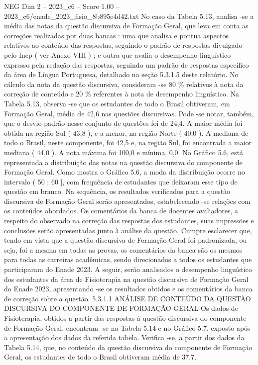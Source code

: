 \begin{textsample}{NEG Dim 2 – 2023\_c6 – Score 1.00 – 2023\_c6/enade\_2023\_fisio\_8b895e4d42.txt}
No caso da Tabela 5.13, analisa -se a média das notas da questão discursiva de Formação Geral, que leva em conta as correções realizadas por duas bancas : uma que analisa e pontua aspectos relativos ao conteúdo das respostas, seguindo o padrão de respostas divulgado pelo Inep ( ver Anexo VIII ) ; e outra que avalia o desempenho linguístico expresso pela redação das respostas, seguindo um padrão de respostas específico da área de Língua Portuguesa, detalhado na seção 5.3.1.5 deste relatório.
No cálculo da nota da questão discursiva, consideram -se 80 \% relativos à nota da correção de conteúdo e 20 \% referentes à nota de desempenho linguístico.
Na Tabela 5.13, observa -se que os estudantes de todo o Brasil obtiveram, em Formação Geral, média de 42,6 nas questões discursivas.
Pode -se notar, também, que o desvio-padrão nesse conjunto de questões foi de 24,4.
A maior média foi obtida na região Sul ( 43,8 ), e a menor, na região Norte ( 40,0 ).
A mediana de todo o Brasil, neste componente, foi 42,5 e, na região Sul, foi encontrada a maior mediana ( 44,0 ).
A nota máxima foi 100,0 e mínima, 0,0.
No Gráfico 5.6, está representada a distribuição das notas na questão discursiva do componente de Formação Geral.
Como mostra o Gráfico 5.6, a moda da distribuição ocorre no intervalo ( 50 ; 60 ], com frequência de estudantes que deixaram esse tipo de questão em branco.
Na sequência, os resultados verificados para a questão discursiva de Formação Geral serão apresentados, estabelecendo -se relações com os conteúdos abordados.
Os comentários da banca de docentes avaliadores, a respeito do observado na correção das respostas dos estudantes, suas impressões e conclusões serão apresentadas junto à análise da questão.
Cumpre esclarecer que, tendo em vista que a questão discursiva de Formação Geral foi padronizada, ou seja, foi a mesma em todas as provas, os comentários da banca são os mesmos para todas as carreiras acadêmicas, sendo direcionados a todos os estudantes que participaram do Enade 2023.
A seguir, serão analisados o desempenho linguístico dos estudantes da área de Fisioterapia na questão discursiva de Formação Geral do Enade 2023, apresentando -se os resultados obtidos e os comentários da banca de correção sobre a questão. 5.3.1.1 ANÁLISE DE CONTEÚDO DA QUESTÃO DISCURSIVA DO COMPONENTE DE FORMAÇÃO GERAL Os dados de Fisioterapia, obtidos a partir das respostas à questão discursiva do componente de Formação Geral, encontram -se na Tabela 5.14 e no Gráfico 5.7, exposto após a apresentação dos dados da referida tabela.
Verifica -se, a partir dos dados da Tabela 5.14, que, no conteúdo da questão discursiva do componente de Formação Geral, os estudantes de todo o Brasil obtiveram média de 37,7.

\end{textsample}
